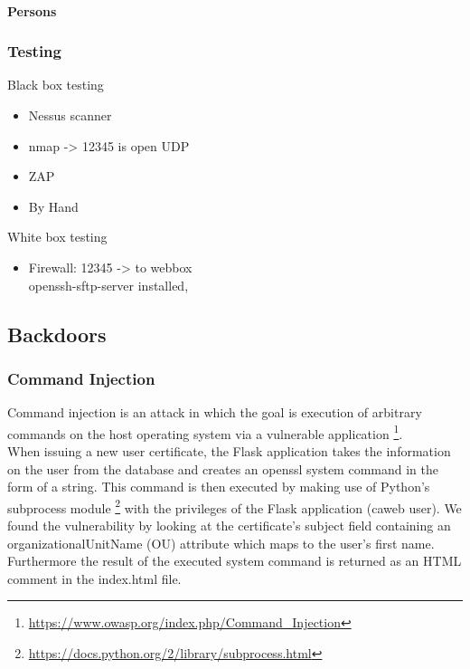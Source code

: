 \documentclass[english]{article}
\begin{document}
\paragraph{Persons}


\subsubsection{Testing}

Black box testing
\begin{itemize}
	
	\item Nessus scanner
	\item nmap -> 12345 is open UDP
	\item ZAP
	\item By Hand

\end{itemize}

White box testing

\begin{itemize}
	\item Firewall: 12345 -> to webbox\\ openssh-sftp-server installed,  
\end{itemize}



\subsection{Backdoors}


\subsubsection{Command Injection}
Command injection is an attack in which the goal is execution of arbitrary commands on the host operating system via a vulnerable application \footnote{\url{https://www.owasp.org/index.php/Command_Injection}}.\\
 When issuing a new user certificate, the Flask application takes the information on the user from the database and creates an openssl system command in the form of a string. This command is then executed by making use of Python's subprocess module \footnote{\url{https://docs.python.org/2/library/subprocess.html}} with the privileges of the Flask application (caweb user). 
 We found the vulnerability by looking at the certificate's subject field containing an organizationalUnitName (OU) attribute which maps to the user's first name. Furthermore the result of the executed system command is returned as an HTML comment in the index.html file.
 
\end{document}
